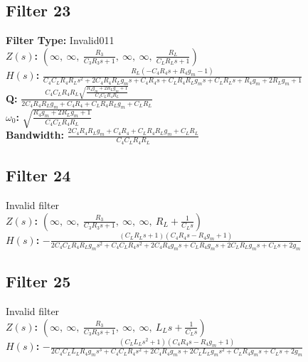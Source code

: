 \documentclass{article}
\begin{document}
\subsection*{Filter 23}
\textbf{Filter Type:} Invalid011 \\ 
\textbf{$Z(s)$:} $\left( \infty, \  \infty, \  \frac{R_{3}}{C_{3} R_{3} s + 1}, \  \infty, \  \infty, \  \frac{R_{L}}{C_{L} R_{L} s + 1}\right)$ \\ 
\textbf{$H(s)$:} $\frac{R_{L} \left(- C_{4} R_{4} s + R_{4} g_{m} - 1\right)}{C_{4} C_{L} R_{4} R_{L} s^{2} + 2 C_{4} R_{4} R_{L} g_{m} s + C_{4} R_{4} s + C_{L} R_{4} R_{L} g_{m} s + C_{L} R_{L} s + R_{4} g_{m} + 2 R_{L} g_{m} + 1}$ \\ 
\textbf{Q:} $\frac{C_{4} C_{L} R_{4} R_{L} \sqrt{\frac{R_{4} g_{m} + 2 R_{L} g_{m} + 1}{C_{4} C_{L} R_{4} R_{L}}}}{2 C_{4} R_{4} R_{L} g_{m} + C_{4} R_{4} + C_{L} R_{4} R_{L} g_{m} + C_{L} R_{L}}$ \\ 
\textbf{$\omega_0$:} $\sqrt{\frac{R_{4} g_{m} + 2 R_{L} g_{m} + 1}{C_{4} C_{L} R_{4} R_{L}}}$ \\ 
\textbf{Bandwidth:} $\frac{2 C_{4} R_{4} R_{L} g_{m} + C_{4} R_{4} + C_{L} R_{4} R_{L} g_{m} + C_{L} R_{L}}{C_{4} C_{L} R_{4} R_{L}}$ \\ 
\subsection*{Filter 24}
Invalid filter \\ 
\textbf{$Z(s)$:} $\left( \infty, \  \infty, \  \frac{R_{3}}{C_{3} R_{3} s + 1}, \  \infty, \  \infty, \  R_{L} + \frac{1}{C_{L} s}\right)$ \\ 
\textbf{$H(s)$:} $- \frac{\left(C_{L} R_{L} s + 1\right) \left(C_{4} R_{4} s - R_{4} g_{m} + 1\right)}{2 C_{4} C_{L} R_{4} R_{L} g_{m} s^{2} + C_{4} C_{L} R_{4} s^{2} + 2 C_{4} R_{4} g_{m} s + C_{L} R_{4} g_{m} s + 2 C_{L} R_{L} g_{m} s + C_{L} s + 2 g_{m}}$ \\ 
\subsection*{Filter 25}
Invalid filter \\ 
\textbf{$Z(s)$:} $\left( \infty, \  \infty, \  \frac{R_{3}}{C_{3} R_{3} s + 1}, \  \infty, \  \infty, \  L_{L} s + \frac{1}{C_{L} s}\right)$ \\ 
\textbf{$H(s)$:} $- \frac{\left(C_{L} L_{L} s^{2} + 1\right) \left(C_{4} R_{4} s - R_{4} g_{m} + 1\right)}{2 C_{4} C_{L} L_{L} R_{4} g_{m} s^{3} + C_{4} C_{L} R_{4} s^{2} + 2 C_{4} R_{4} g_{m} s + 2 C_{L} L_{L} g_{m} s^{2} + C_{L} R_{4} g_{m} s + C_{L} s + 2 g_{m}}$ \\ 
\end{document}
